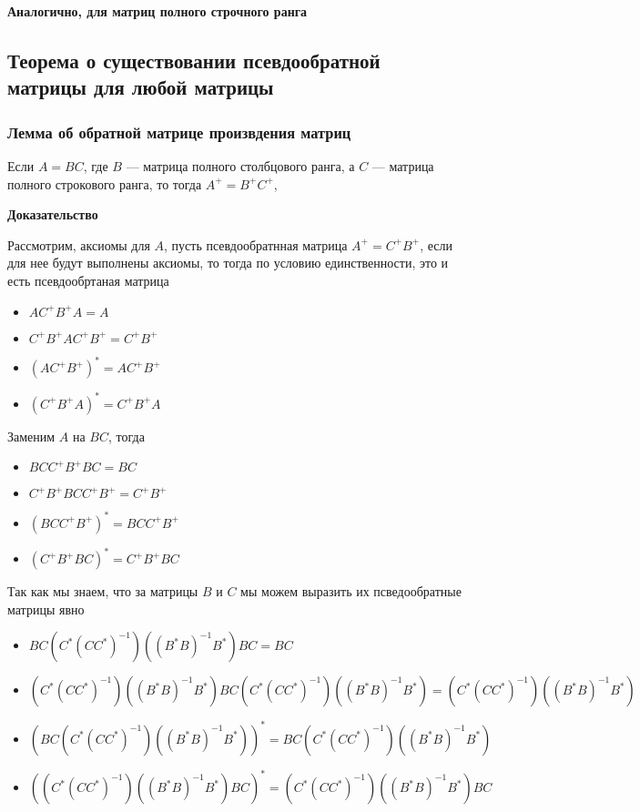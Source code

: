 \documentclass{article}
\begin{document}
    \textbf{Аналогично, для матриц полного строчного ранга}


    \subsection{Теорема о существовании псевдообратной матрицы для любой матрицы}

    \subsubsection{Лемма об обратной матрице произвдения матриц}

    Если $A = BC$, где $B$ --- матрица полного столбцового ранга,
    а $C$ --- матрица полного строкового ранга, то тогда $A^{+} = B^{+} C^{+}$,

    \quad

    \textbf{Доказательство}

    \quad

    Рассмотрим, аксиомы для $A$, пусть псевдообратнная матрица $A^{+} = C^{+} B^{+} $, если для нее будут выполнены аксиомы,
    то тогда по условию единственности, это и есть псевдообртаная матрица

    \begin{itemize}
        \item $A C^{+} B^{+} A = A$
        \item $C^{+} B^{+} A C^{+} B^{+} = C^{+} B^{+}$
        \item $(A C^{+} B^{+})^{*} = AC^{+} B^{+}$
        \item $(C^{+} B^{+} A)^{*} = C^{+} B^{+}A$
    \end{itemize}

    Заменим $A$ на $BC$, тогда

    \begin{itemize}
        \item $BC C^{+} B^{+} BC = BC$
        \item $C^{+} B^{+} BC C^{+} B^{+} = C^{+} B^{+}$
        \item $(BC C^{+} B^{+})^{*} = BCC^{+} B^{+}$
        \item $(C^{+} B^{+} BC)^{*} = C^{+} B^{+}BC$
    \end{itemize}

    Так как мы знаем, что за матрицы $B$ и $C$ мы можем выразить их псведообратные матрицы явно

    \begin{itemize}
        \item $BC ( C^{*} (C C ^{*})^{-1} ) ( (B^{*} B)^{-1} B^{*} ) BC = BC$
        \item $(C^{*} (C C ^{*})^{-1}) ( (B^{*} B)^{-1} B^{*} ) BC (C^{*} (C C ^{*})^{-1}) ( (B^{*} B)^{-1} B^{*}) = (C^{*} (C C ^{*})^{-1})( (B^{*} B)^{-1} B^{*})$
        \item $(BC (C^{*} (C C ^{*})^{-1}) ((B^{*} B)^{-1} B^{*}))^{*} = BC (C^{*} (C C ^{*})^{-1}) ((B^{*} B)^{-1} B^{*})$
        \item $((C^{*} (C C ^{*})^{-1}) ( (B^{*} B)^{-1} B^{*}) BC)^{*} = (C^{*} (C C ^{*})^{-1}) ( (B^{*} B)^{-1} B^{*}) BC$
    \end{itemize}
\end{document}
